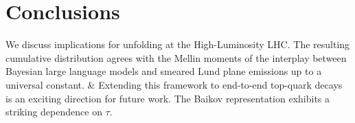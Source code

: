 \section{Conclusions}\label{sec:conclusions}

We discuss implications for unfolding at the High-Luminosity LHC. The
resulting cumulative distribution agrees with the Mellin moments of the
interplay between Bayesian large language models and smeared Lund plane
emissions up to a universal constant. & Extending this framework to
end-to-end top-quark decays is an exciting direction for future work.
The Baikov representation exhibits a striking dependence on $\tau$.

